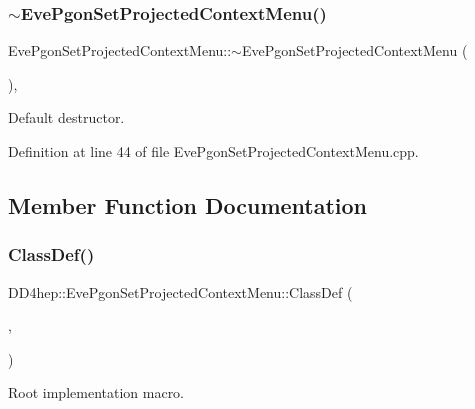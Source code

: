 \subsubsection{\texorpdfstring{$\sim$\+Eve\+Pgon\+Set\+Projected\+Context\+Menu()}{~EvePgonSetProjectedContextMenu()}}
{\footnotesize\ttfamily Eve\+Pgon\+Set\+Projected\+Context\+Menu\+::$\sim$\+Eve\+Pgon\+Set\+Projected\+Context\+Menu (\begin{DoxyParamCaption}{ }\end{DoxyParamCaption})\hspace{0.3cm}{\ttfamily [protected]}, {\ttfamily [virtual]}}



Default destructor. 



Definition at line 44 of file Eve\+Pgon\+Set\+Projected\+Context\+Menu.\+cpp.



\subsection{Member Function Documentation}
\hypertarget{class_d_d4hep_1_1_eve_pgon_set_projected_context_menu_aea367eff04cd968f43590dd69a718ffb}{}\label{class_d_d4hep_1_1_eve_pgon_set_projected_context_menu_aea367eff04cd968f43590dd69a718ffb} 
\subsubsection{\texorpdfstring{Class\+Def()}{ClassDef()}}
{\footnotesize\ttfamily D\+D4hep\+::\+Eve\+Pgon\+Set\+Projected\+Context\+Menu\+::\+Class\+Def (\begin{DoxyParamCaption}\item[{\hyperlink{class_d_d4hep_1_1_eve_pgon_set_projected_context_menu}{Eve\+Pgon\+Set\+Projected\+Context\+Menu}}]{,  }\item[{0}]{ }\end{DoxyParamCaption})}



Root implementation macro. 

\hypertarget{class_d_d4hep_1_1_eve_pgon_set_projected_context_menu_a1704c29806f07b92caf26bee83b69722}{}\label{class_d_d4hep_1_1_eve_pgon_set_projected_context_menu_a1704c29806f07b92caf26bee83b69722} 
